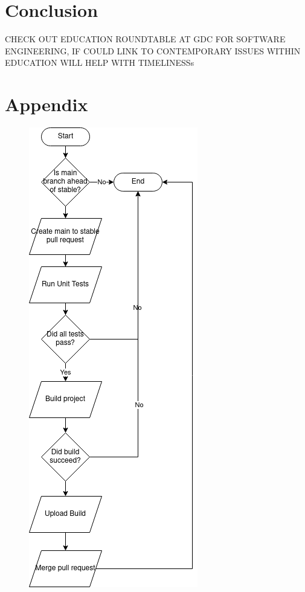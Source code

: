 \documentclass[journal]{IEEEtran}
\begin{document}
\section{Conclusion}

CHECK OUT EDUCATION ROUNDTABLE AT GDC FOR SOFTWARE ENGINEERING, IF COULD LINK TO CONTEMPORARY ISSUES WITHIN EDUCATION WILL HELP WITH TIMELINESSs



\section{Appendix}
\begin{figure}
    \includegraphics[width=0.95\columnwidth]{Images/CD.png}

\end{figure}
\end{document}

